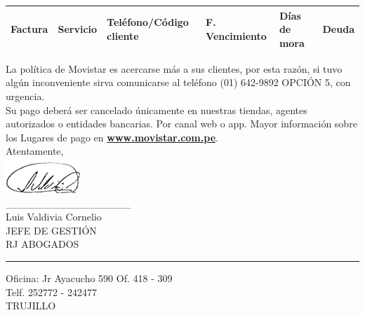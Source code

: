 \begin{center}
\scriptsize
\begin{tabular}{|x{1.2cm}|x{2cm}|x{3.5cm}|x{2.5cm}|x{2cm}|x{2cm}|}
\hline
\textbf{Factura} & \textbf{Servicio} & \textbf{Teléfono/Código cliente} & \textbf{F. Vencimiento} & \textbf{Días de mora} & \textbf{Deuda} \\
\hline
\hline
\end{tabular}
\end{center}

\noindent La política de Movistar es acercarse más a sus clientes, por esta razón, si tuvo algún inconveniente sirva comunicarse al teléfono (01) 642-9892 OPCIÓN 5, con urgencia.\\

\noindent Su pago deberá ser cancelado únicamente en nuestras tiendas, agentes autorizados o entidades bancarias. Por canal web o app. Mayor información sobre los Lugares de pago en \underline{\textcolor[rgb]{0.00,0.07,1.00}{\textbf{www.movistar.com.pe}}}.\\

\noindent Atentamente,\\
\includegraphics[natwidth=2.831041667cm, natheight=1.322916667cm]{resources/lawyer_signature.png}\\
\_\_\_\_\_\_\_\_\_\_\_\_\_\_\_\_\_\\
{\small Luis Valdivia Cornelio\\
JEFE DE GESTIÓN\\
RJ ABOGADOS}\\


\textcolor[rgb]{1.00,0.00,0.00}{\hrule}
\vspace{0.2cm}
{\noindent\footnotesize Oficina: Jr Ayacucho 590 Of. 418 - 309\\
Telf. 252772 - 242477\\
TRUJILLO}


